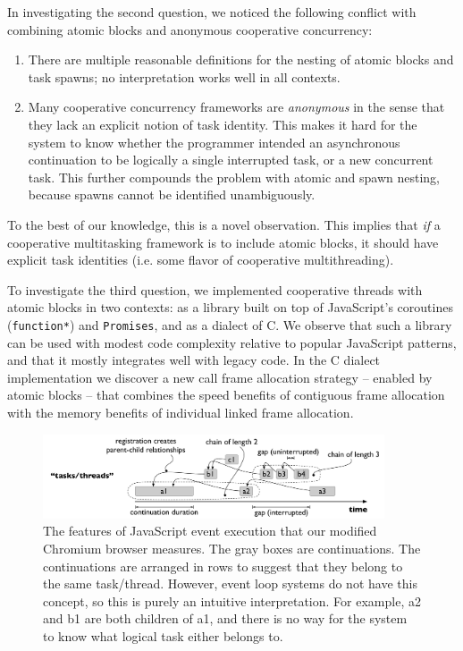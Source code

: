 \documentclass[acmsmall,anonymous,review]{acmart}\settopmatter{printfolios=true,printccs=false,printacmref=false}
\begin{document}
In investigating the second question, we noticed the following conflict with combining atomic blocks and anonymous cooperative concurrency:
\begin{enumerate}
\item There are multiple reasonable definitions for the nesting of atomic blocks and task spawns; no interpretation works well in all contexts.
\item Many cooperative concurrency frameworks are \emph{anonymous} in the sense that they lack an explicit notion of task identity.
  This makes it hard for the system to know whether the programmer intended an asynchronous continuation to be logically a single interrupted task, or a new concurrent task.
  This further compounds the problem with atomic and spawn nesting, because spawns cannot be identified unambiguously.
\end{enumerate}
To the best of our knowledge, this is a novel observation.
This implies that \emph{if} a cooperative multitasking framework is to include atomic blocks, it should have explicit task identities (i.e. some flavor of cooperative multithreading).

To investigate the third question, we implemented cooperative threads with atomic blocks in two contexts: as a library built on top of JavaScript's coroutines (\texttt{function*}) and \texttt{Promises}, and as a dialect of C.
We observe that such a library can be used with modest code complexity relative to popular JavaScript patterns, and that it mostly integrates well with legacy code.
In the C dialect implementation we discover a new call frame allocation strategy -- enabled by atomic blocks -- that combines the speed benefits of contiguous frame allocation with the memory benefits of individual linked frame allocation.

\begin{figure}
\includegraphics[width=0.9\textwidth]{Figures/continuation_tree}
\caption{The features of JavaScript event execution that our modified Chromium browser measures.
  The gray boxes are continuations.
  The continuations are arranged in rows to suggest that they belong to the same task/thread.
  However, event loop systems do not have this concept, so this is purely an intuitive interpretation.
  For example, a2 and b1 are both children of a1, and there is no way for the system to know what logical task either belongs to.}
\label{fig:continuation_tree}
\end{figure}
\end{document}
